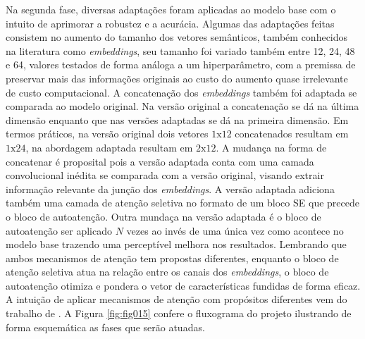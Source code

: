 Na segunda fase, diversas adaptações foram aplicadas ao modelo base com o intuito de aprimorar a robustez e a acurácia. Algumas das adaptações feitas consistem no aumento do tamanho dos vetores semânticos, também conhecidos na literatura como \textit{embeddings}, seu tamanho foi variado também entre 12, 24, 48 e 64, valores testados de forma análoga a um hiperparâmetro, com a premissa de preservar mais das informações originais ao custo do aumento quase irrelevante de custo computacional. A concatenação dos \textit{embeddings} também foi adaptada se comparada ao modelo original. Na versão original a concatenação se dá na última dimensão enquanto que nas versões adaptadas se dá na primeira dimensão. Em termos práticos, na versão original dois vetores $1\text{x}12$ concatenados resultam em $1\text{x}24$, na abordagem adaptada resultam em $2\text{x}12$. A mudança na forma de concatenar é proposital pois a versão adaptada conta com uma camada convolucional inédita se comparada com a versão original, visando extrair informação relevante da junção dos \textit{embeddings}. A versão adaptada adiciona também uma camada de atenção seletiva no formato de um bloco \gls{SE} que precede o bloco de autoatenção. Outra mundaça na versão adaptada é o bloco de autoatenção ser aplicado $N$ vezes ao invés de uma única vez como acontece no modelo base trazendo uma perceptível melhora nos resultados. Lembrando que ambos mecanismos de atenção tem propostas diferentes, enquanto o bloco de atenção seletiva atua na relação entre os canais dos \textit{embeddings}, o bloco de autoatenção otimiza e pondera o vetor de características fundidas de forma eficaz. A intuição de aplicar mecanismos de atenção com propósitos diferentes vem do trabalho de \cite{yangNeuralNetworkDesign2024a}. A Figura \ref{fig:fig015} confere o fluxograma do projeto ilustrando de forma esquemática as fases que serão atuadas.

